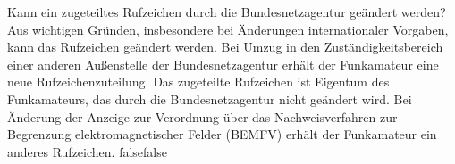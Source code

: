     {Kann ein zugeteiltes Rufzeichen durch die Bundesnetzagentur geändert werden?}
    {Aus wichtigen Gründen, insbesondere bei Änderungen internationaler Vorgaben, kann das Rufzeichen geändert werden.}
    {Bei Umzug in den Zuständigkeitsbereich einer anderen Außenstelle der Bundesnetzagentur erhält der Funkamateur eine neue Rufzeichenzuteilung.}
    {Das zugeteilte Rufzeichen ist Eigentum des Funkamateurs, das durch die Bundesnetzagentur nicht geändert wird.}
    {Bei Änderung der Anzeige zur Verordnung über das Nachweisverfahren zur Begrenzung elektromagnetischer Felder (BEMFV) erhält der Funkamateur ein anderes Rufzeichen.}
    {false}{false}
